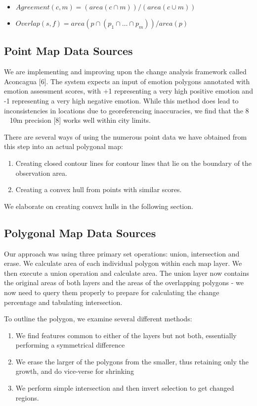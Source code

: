 \documentclass[conference]{IEEEtran}
\begin{document}
\begin{itemize}
	\item $Agreement (c, m) = (area(c\cap m))/(area(c\cup m))$

	\item $Overlap(s,f)= area(p\cap (p_1\cap …\cap p_m))/area(p)$

\end{itemize}

\subsection{Point Map Data Sources}
We are implementing and improving upon the change analysis framework called Aconcagua [6]. The system expects an input of emotion polygons annotated with emotion assessment scores, with +1 representing a very high positive emotion and -1 representing a very high negative emotion. While this method does lead to inconsistencies in locations due to georeferencing inaccuracies, we find that the 8 ~ 10m precision [8] works well within city limits.

There are several ways of using the numerous point data we have obtained from this step into an actual polygonal map: 

\begin{enumerate}

\item Creating closed contour lines for contour lines that lie on the boundary of the observation area.
\item Creating a convex hull from points with similar scores.
\end{enumerate}

We elaborate on creating convex hulls in the following section.

\subsection{Polygonal Map Data Sources}


Our approach was using three primary set operations: union, intersection and erase. We calculate area of each individual polygon within each map layer. We then execute a union operation and calculate area. The union layer now contains the original areas of both layers and the areas of the overlapping polygons - we now need to query them properly to prepare for calculating the change percentage and tabulating intersection.

To outline the polygon, we examine several different methods:
\begin{enumerate}
	\item We find features common to either of the layers but not both, essentially performing a symmetrical difference
	\item We erase the larger of the polygons from the smaller, thus retaining only the growth, and do vice-verse for shrinking
	\item We perform simple intersection and then invert selection to get changed regions. 
\end{enumerate}
\end{document}
